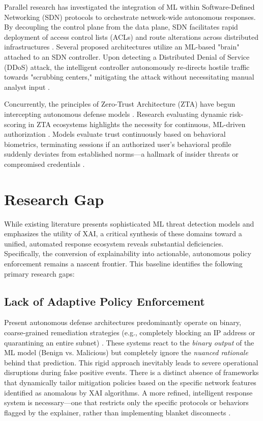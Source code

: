 \documentclass[conference]{IEEEtran}
\begin{document}
Parallel research has investigated the integration of ML within Software-Defined Networking (SDN) protocols to orchestrate network-wide autonomous responses. By decoupling the control plane from the data plane, SDN facilitates rapid deployment of access control lists (ACLs) and route alterations across distributed infrastructures \cite{sharafaldin2018toward}. Several proposed architectures utilize an ML-based "brain" attached to an SDN controller. Upon detecting a Distributed Denial of Service (DDoS) attack, the intelligent controller autonomously re-directs hostile traffic towards "scrubbing centers," mitigating the attack without necessitating manual analyst input \cite{moustafa2015unsw, mahbooba2021explainable}.

Concurrently, the principles of Zero-Trust Architecture (ZTA) have begun intercepting autonomous defense models \cite{alotaibi2023adaptive}. Research evaluating dynamic risk-scoring in ZTA ecosystems highlights the necessity for continuous, ML-driven authorization \cite{chen2016xgboost}. Models evaluate trust continuously based on behavioral biometrics, terminating sessions if an authorized user's behavioral profile suddenly deviates from established norms—a hallmark of insider threats or compromised credentials \cite{ke2017lightgbm, ahmad2020network}.

\section{Research Gap}

While existing literature presents sophisticated ML threat detection models and emphasizes the utility of XAI, a critical synthesis of these domains toward a unified, automated response ecosystem reveals substantial deficiencies. Specifically, the conversion of explainability into actionable, autonomous policy enforcement remains a nascent frontier. This baseline identifies the following primary research gaps:

\subsection{Lack of Adaptive Policy Enforcement}
Present autonomous defense architectures predominantly operate on binary, coarse-grained remediation strategies (e.g., completely blocking an IP address or quarantining an entire subnet) \cite{wang2021explainable}. These systems react to the \textit{binary output} of the ML model (Benign vs. Malicious) but completely ignore the \textit{nuanced rationale} behind that prediction. This rigid approach inevitably leads to severe operational disruptions during false positive events. There is a distinct absence of frameworks that dynamically tailor mitigation policies based on the specific network features identified as anomalous by XAI algorithms. A more refined, intelligent response system is necessary—one that restricts only the specific protocols or behaviors flagged by the explainer, rather than implementing blanket disconnects \cite{lundberg2017unified}.
\end{document}
